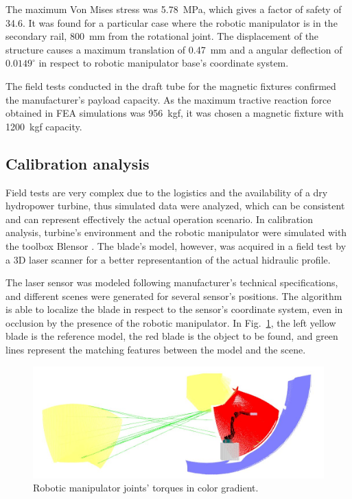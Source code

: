 The maximum Von Mises stress was 5.78~MPa, which gives a factor of safety of
34.6. It was found for a particular case where the robotic manipulator is in
the secondary rail, 800~mm from the rotational joint. The displacement of the
structure causes a maximum translation of 0.47~mm and a angular deflection of
$0.0149^{\circ}$ in respect to robotic manipulator base's coordinate system. 

The field tests conducted in the draft tube for the magnetic fixtures confirmed
the manufacturer's payload capacity. As the maximum tractive reaction force
obtained in FEA simulations was 956~kgf, it was chosen a magnetic fixture
with 1200~kgf capacity. 


\subsection{Calibration analysis}

Field tests are very complex due to the logistics and the availability of a dry
hydropower turbine, thus simulated data were analyzed, which can be consistent
and can represent effectively the actual operation scenario. In calibration
analysis, turbine's environment and the robotic manipulator were simulated with
the toolbox Blensor \cite{Gschwandtner11b}. The blade's model, however, was
acquired in a field test by a 3D laser scanner for a better representantion of
the actual hidraulic profile.

The laser sensor was modeled following manufacturer's technical
specifications, and different scenes were generated for several sensor's
positions. The algorithm is able to localize the blade in respect to the
sensor's coordinate system, even in occlusion by the presence of the robotic
manipulator. In Fig.~\ref{fig:calibration}, the left yellow blade is the
reference model, the red blade is the object to be found, and green lines
represent the matching features between the model and the scene.

\begin{figure}
	\centering
	\includegraphics[width=.95\columnwidth]{figs/results/sim_mh12_sp}
    \caption{Robotic manipulator joints' torques in color gradient.}
    \label{fig:calibration}
\end{figure}